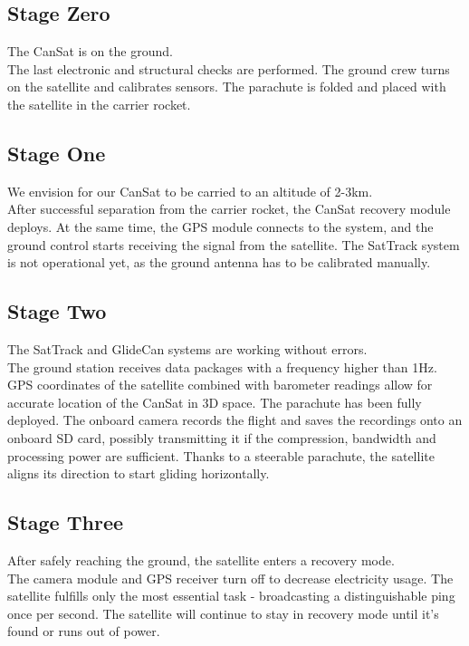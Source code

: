 \documentclass[class=report, crop=false]{standalone}
\begin{document}
\subsection*{Stage Zero}
The CanSat is on the ground. \\
The last electronic and structural checks are performed.
The ground crew turns on the satellite and calibrates sensors.
The parachute is folded and placed with the satellite in the carrier rocket.
\subsection*{Stage One}
We envision for our CanSat to be carried to an altitude of 2-3km. \\
After successful separation from the carrier rocket, the CanSat recovery module deploys.
At the same time, the GPS module connects to the system, and the ground control starts receiving the signal from the satellite.
The SatTrack system is not operational yet, as the ground antenna has to be calibrated manually.
\subsection*{Stage Two}
The SatTrack and GlideCan systems are working without errors. \\
The ground station receives data packages with a frequency higher than 1Hz. GPS coordinates of the satellite combined with barometer readings allow for accurate location of the CanSat in 3D space.
The parachute has been fully deployed. The onboard camera records the flight and saves the recordings onto an onboard SD card, possibly transmitting it if the compression, bandwidth and processing power are sufficient.
Thanks to a steerable parachute, the satellite aligns its direction to start gliding horizontally.
\subsection*{Stage Three}
After safely reaching the ground, the satellite enters a recovery mode. \\
The camera module and GPS receiver turn off to decrease electricity usage. The satellite fulfills only the most essential task - broadcasting a distinguishable ping once per second.
The satellite will continue to stay in recovery mode until it's found or runs out of power.
\end{document}
